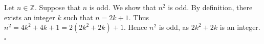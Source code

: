 Let $n \in \mathbb{Z}$.
Suppose that $n$ is odd.
We show that $n^{2}$ is odd.
By definition, there exists an integer $k$ such that $n = 2k + 1$.
Thus $n^{2} = 4k^{2} + 4k + 1 = 2(2k^{2} + 2k) + 1$.
Hence $n^{2}$ is odd, as $2k^{2} + 2k$ is an integer. \hfill$\square$